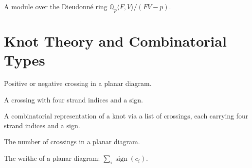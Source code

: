 \begin{definition}[F-Isocrystal]
  \label{def:f-isocrystal}
  A module over the Dieudonné ring $\mathbb{Q}_p\langle F, V\rangle
  / (FV - p)$.
\end{definition}


\chapter{Knot Theory and Combinatorial Types}

\begin{definition}
  \label{def:crossing-sign}
  \leanok
  Positive or negative crossing in a planar diagram.
\end{definition}

\begin{definition}[Crossing]
  \label{def:crossing}
  \leanok
  A crossing with four strand indices and a sign.
\end{definition}

\begin{definition}
  \label{def:planar-diagram}
  A combinatorial representation of a knot via a list of crossings,
  each carrying four strand indices and a sign.
\end{definition}

\begin{definition}
  \label{def:crossing-count}
  \leanok
  The number of crossings in a planar diagram.
\end{definition}

\begin{definition}[Writhe]
  \label{def:writhe}
  \leanok
  The writhe of a planar diagram: $\sum_i \operatorname{sign}(c_i)$.
\end{definition}

